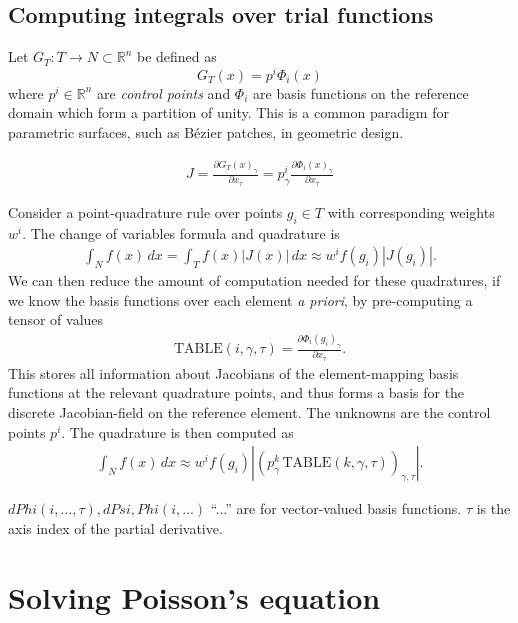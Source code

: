 \documentclass[11pt,a4paper]{memoir}
\newcommand{\pdf}[2]{\frac{\partial #1}{\partial #2}}
\begin{document}
\subsection{Computing integrals over trial functions} %

% 

Let $G_T: T \rightarrow N \subset \mathbb{R}^n$ be defined as
    $$G_T(x) = p^i \Phi_i(x)$$
where $p^i \in \mathbb{R}^n$ are \textit{control points} and $\Phi_i$ are basis functions on the reference domain which form a partition of unity. This is a common paradigm for parametric surfaces,
such as B\'ezier patches, in geometric design.

\begin{align*}
    J = \pdf{G_T(x)_\gamma}{x_\tau} = p^i_\gamma\pdf{\Phi_i(x)_\gamma}{x_\tau}
\end{align*}

Consider a point-quadrature rule over points $g_i \in T$ with corresponding weights $w^i$.
The change of variables formula and quadrature is
\begin{align*}
    \int_N f(x)\, dx = \int_T f(x)|J(x)|\, dx \approx w^i f(g_i)|J(g_i)|.
\end{align*}
We can then reduce the amount of computation needed for these quadratures, if we know the basis functions over each element \textit{a priori},
by pre-computing a tensor of values
\begin{align*}
    \text{TABLE}(i, \gamma, \tau) = \pdf{\Phi_i(g_i)_\gamma}{x_\tau}.
\end{align*}
This stores all information about Jacobians of the element-mapping basis functions at the relevant
quadrature points, and thus forms a basis for the discrete Jacobian-field on the reference element.
The unknowns are the control points $p^i$. The quadrature is then computed as
\begin{align*}
    \int_N{f(x)\, dx} \approx w^i f(g_i) \left\vert\left(p^k_\gamma\,\text{TABLE}(k, \gamma, \tau)\right)_{\gamma,\tau}\right\vert.
\end{align*}

$dPhi(i, ..., \tau), dPsi, Phi(i, ...)$
``...'' are for vector-valued basis functions. $\tau$ is the axis index of the partial derivative.

\section{Solving Poisson's equation}
\end{document}
